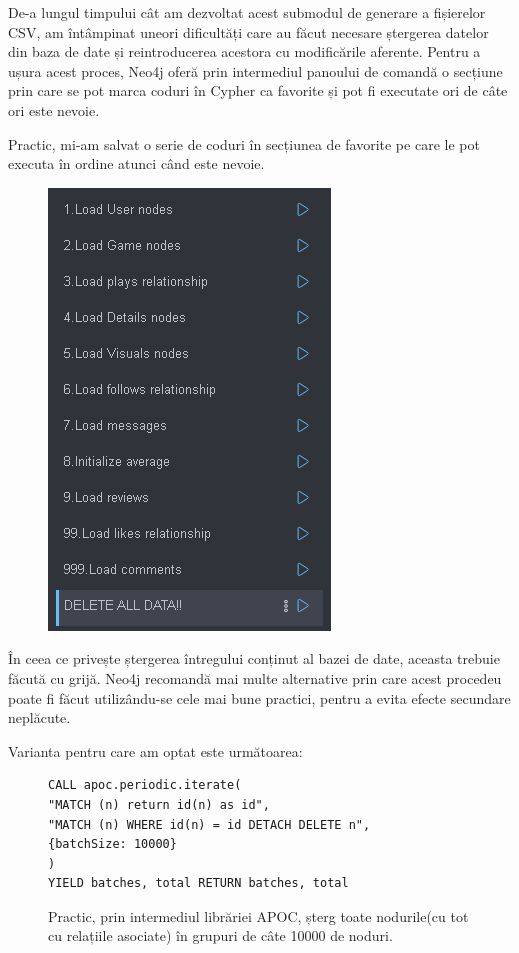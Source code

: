 \documentclass[12pt,a4paper]{report}
\begin{document}
De-a lungul timpului cât am dezvoltat acest submodul de generare a fișierelor CSV, am întâmpinat uneori dificultăți care au făcut necesare ștergerea datelor din baza de date și reintroducerea acestora cu modificările aferente. Pentru a ușura acest proces, Neo4j oferă prin intermediul panoului de comandă o secțiune prin care se pot marca coduri în Cypher ca favorite și pot fi executate ori de câte ori este nevoie.

Practic, mi-am salvat o serie de coduri în secțiunea de favorite pe care le pot executa în ordine atunci când este nevoie. 

\begin{figure}[H]
\centering
\caption{}
\includegraphics[scale = 0.8]{exemplu_15_favorites}
\caption*{}
\end{figure}

În ceea ce privește ștergerea întregului conținut al bazei de date, aceasta trebuie făcută cu grijă. Neo4j recomandă mai multe alternative prin care acest procedeu poate fi făcut utilizându-se cele mai bune practici, pentru a evita efecte secundare neplăcute. \cite{19}

Varianta pentru care am optat este următoarea:

\begin{figure}[H]
\centering
\begin{BVerbatim}
CALL apoc.periodic.iterate(
"MATCH (n) return id(n) as id",
"MATCH (n) WHERE id(n) = id DETACH DELETE n", 
{batchSize: 10000}
)
YIELD batches, total RETURN batches, total
\end{BVerbatim}
\caption*{Practic, prin intermediul librăriei APOC, șterg toate nodurile(cu tot cu relațiile asociate) în grupuri de câte 10000 de noduri.}
\end{figure}
\end{document}
